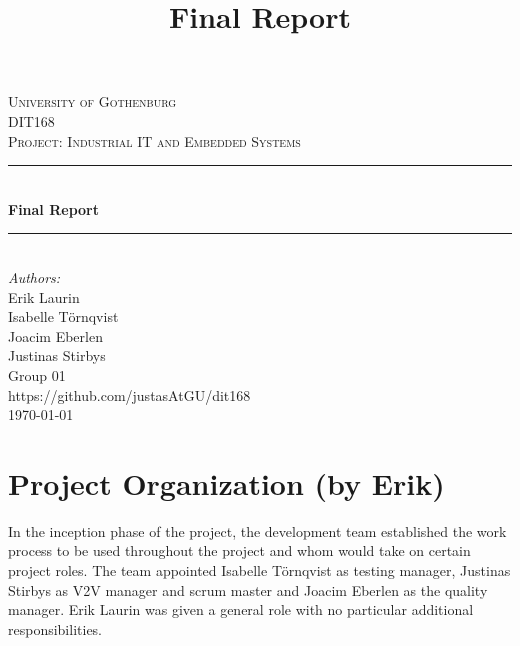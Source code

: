 \documentclass[12pt]{article}
\begin{document}
\begin{titlepage}

\newcommand{\Line}{\rule{\linewidth}{0.5mm}} 

\center
 
\textsc{\LARGE University of Gothenburg}
\\[3.5cm] 

\textsc{\Large DIT168}\\[0.3cm]
\textsc{\large Project: Industrial IT and Embedded Systems}\\[0.5cm]

\Line \\[0.4cm]
{\huge \bfseries Final Report}\\[0.4cm]
\title{Final Report} %
\Line \\[0.5cm]
 
\Large \textit{Authors:}
\\Erik Laurin
\\Isabelle Törnqvist
\\Joacim Eberlen
\\Justinas Stirbys \\[3cm]

{\large Group 01} \\[0.3cm]
{\large https://github.com/justasAtGU/dit168} \\[0.3cm]
{\large \today}

\vfill

\end{titlepage}

\tableofcontents
\pagebreak

\section{Project Organization (by Erik)}\label{project organization}
In the inception phase of the project, the development team established the work process to be used throughout the project and whom would take on certain project roles. The team appointed Isabelle Törnqvist as testing manager, Justinas Stirbys as V2V manager and scrum master and Joacim Eberlen as the quality manager. Erik Laurin was given a  general role with no particular additional responsibilities.
\end{document}
